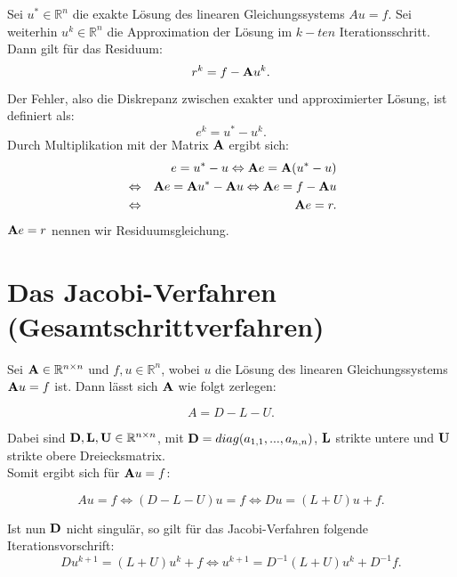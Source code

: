 Sei $u^{*} \in \mathbb{R}^{n}$ die exakte Lösung des linearen Gleichungssystems $Au = f$. Sei weiterhin $u^{k} \in \mathbb{R}^{n}$ die Approximation der Lösung im $k-ten$ Iterationsschritt. Dann gilt für das Residuum:
\begin{equation}
r^{k} = f - {\textbf{A}} u^{k}.\label{eq.Residuum}
\end{equation}
Der Fehler, also die Diskrepanz zwischen exakter und approximierter Lösung, ist definiert als:
\begin{equation}
e^{k} = u^{*} - u^{k}.\label{eq.Fehler}
\end{equation}
Durch Multiplikation mit der Matrix ${\textbf{A}}$ ergibt sich:
\begin{eqnarray}
&&e = u^{*} - u \Leftrightarrow {\textbf{A}}e = {\textbf{A}}(u^{*} - u) \notag \\
&\Leftrightarrow& {\textbf{A}}e = {\textbf{A}} u^{*} - {\textbf{A}} u \Leftrightarrow {\textbf{A}}e = f - {\textbf{A}} u \notag \\
&\Leftrightarrow& {\textbf{A}}e = r.\label{eq.Residuumsgleichung}
\end{eqnarray}
${\textbf{A}}e = r$ nennen wir Residuumsgleichung.

\section{Das Jacobi-Verfahren (Gesamtschrittverfahren)}\label{s.Das Jacobi-Iterationsverfahren}

Sei ${\textbf{A}} \in \mathbb{R}^{n \times n}$ und $f,u \in \mathbb{R}^{n}$, wobei $u$ die Lösung des linearen Gleichungssystems ${\textbf{A}}u = f$ ist. Dann lässt sich ${\textbf{A}}$ wie folgt zerlegen:

\begin{equation}
A = D - L - U.
\end{equation}

Dabei sind ${\textbf{D}},{\textbf{L}},{\textbf{U}} \in \mathbb{R}^{n \times n}$, mit ${\textbf{D}} = diag(a_{1,1},...,a_{n,n})$, ${\textbf{L}}$ strikte untere und ${\textbf{U}}$ strikte obere Dreiecksmatrix. \\
Somit ergibt sich für ${\textbf{A}}u = f$:

\begin{equation}
Au = f \Leftrightarrow (D-L-U)u = f \Leftrightarrow Du = (L+U)u + f.
\end{equation}

Ist nun ${\textbf{D}}$ nicht singulär, so gilt für das Jacobi-Verfahren folgende Iterationsvorschrift:
\begin{equation}
Du^{k+1} = (L+U)u^{k} + f \Leftrightarrow u^{k+1} = D^{-1}(L+U)u^{k} + D^{-1}f.
\end{equation}

